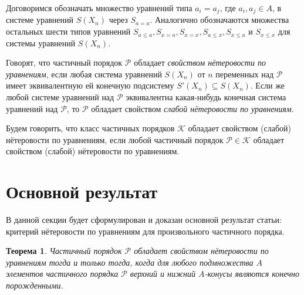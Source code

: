 \documentclass[12pt]{article}
\theoremstyle{break}
\newtheorem{Th}{Теорема}
\def\P{\mathcal{P}}
\begin{document}
		Договоримся обозначать множество уравнений типа $a_i=a_j$, где $a_i, a_j\in A$, в системе уравнений $S(X_n)$ через $S_{a=a}$. Аналогично обозначаются множества остальных шести типов уравнений $S_{a\leqslant a}, S_{x=a}, S_{x=x}, S_{a\leqslant x}, S_{x\leqslant a}$ и $ S_{x\leqslant x}$ для системы уравнений $S(X_n)$.
		
		Говорят, что частичный порядок $\P$ обладает \textit{свойством нётеровости по уравнениям}, если любая система уравнений $S(X_n)$ от $n$ переменных над $\P$ имеет эквивалентную ей конечную подсистему $S'(X_n) \subseteq S(X_n)$. Если же любой системе уравнений над $\P$ эквивалентна какая-нибудь конечная система уравнений над $\P$, то $\P$ обладает свойством \textit{слабой нётеровости по уравнениям}.
		
		Будем говорить, что класс частичных порядков $\mathcal{K}$ обладает свойством (слабой) нётеровости по уравнениям, если любой частичный порядок $\P \in \mathcal{K}$ обладает свойством (слабой) нётеровости по уравнениям.
		
	
	\section{Основной результат}
		В данной секции будет сформулирован и доказан основной результат статьи: критерий нётеровости по уравнениям для произвольного частичного порядка.

		\begin{Th}\label{criterion}
			Частичный порядок $\P$ обладает свойством нётеровости по уравнениям тогда и только тогда, когда для любого подмножества $A$ элементов частичного порядка $\P$ верхний и нижний $A$-конусы являются конечно порожденными.
		\end{Th}
\end{document}

